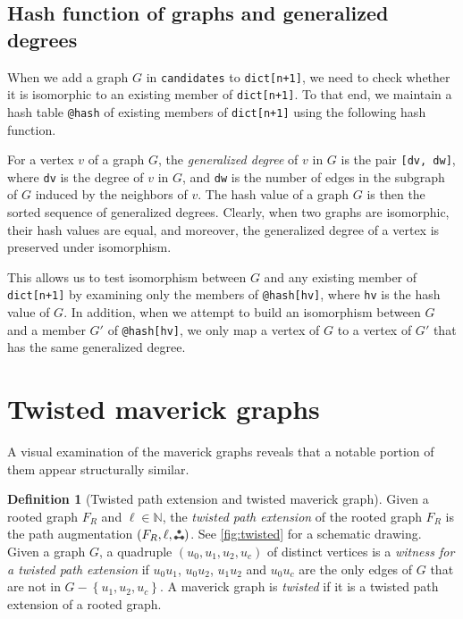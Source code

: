 \documentclass[11pt]{article}
\theoremstyle{definition}
\newtheorem{definition}[theorem]{Definition}
\theoremstyle{remark}
\newcommand{\sset}[1]{\left\{{#1}\right\}}
\newcommand{\N}{\mathbb{N}}
\newcommand{\ftwo}{\tikz[baseline=-0.2ex, scale=0.9]{\draw[darkgray, thick] (0,0)--(0.2,0); \draw[darkgray, fill=darkgray] (0,0) circle (0.05); \draw[darkgray, fill=darkgray] (0.1,0.17320508075) circle (0.05); \draw[darkgray, fill=darkgray] (0.2,0) circle (0.05);}}
\newcommand{\tpe}[1]{(#1,\ftwo)}
\begin{document}
\subsection{Hash function of graphs and generalized degrees} \label{subsec:4}

When we add a graph $G$ in \texttt{candidates} to \texttt{dict[n+1]}, we need to check whether it is isomorphic to an existing member of \texttt{dict[n+1]}. To that end, we maintain a hash table \texttt{@hash} of existing members of \texttt{dict[n+1]} using the following hash function.

For a vertex $v$ of a graph $G$, the \emph{generalized degree} of $v$ in $G$ is the pair \texttt{[dv, dw]}, where \texttt{dv} is the degree of $v$ in $G$, and \texttt{dw} is the number of edges in the subgraph of $G$ induced by the neighbors of $v$. The hash value of a graph $G$ is then the sorted sequence of generalized degrees. Clearly, when two graphs are isomorphic, their hash values are equal, and moreover, the generalized degree of a vertex is preserved under isomorphism.

This allows us to test isomorphism between $G$ and any existing member of \texttt{dict[n+1]} by examining only the members of \texttt{@hash[hv]}, where \texttt{hv} is the hash value of $G$. In addition, when we attempt to build an isomorphism between $G$ and a member $G'$ of \texttt{@hash[hv]}, we only map a vertex of $G$ to a vertex of $G'$ that has the same generalized degree.

\section{Twisted maverick graphs} \label{sec:twisted}

A visual examination of the maverick graphs reveals that a notable portion of them appear structurally similar.

\begin{definition}[Twisted path extension and twisted maverick graph]
    Given a rooted graph $F_R$ and $\ell \in \N$, the \emph{twisted path extension} of the rooted graph $F_R$ is the path augmentation $\tpe{F_R, \ell}$. See \cref{fig:twisted} for a schematic drawing. Given a graph $G$, a quadruple $(u_0,u_1,u_2,u_c)$ of distinct vertices is a \emph{witness for a twisted path extension} if $u_0u_1$, $u_0u_2$, $u_1u_2$ and $u_0u_c$ are the only edges of $G$ that are not in $G - \sset{u_1,u_2,u_c}$. A maverick graph is \emph{twisted} if it is a twisted path extension of a rooted graph.
\end{definition}
\end{document}
